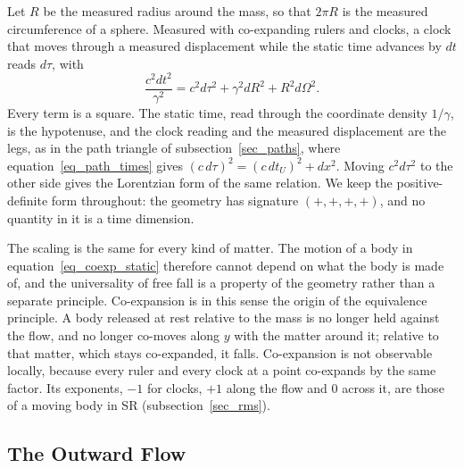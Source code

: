 \documentclass{iopjournal}
\begin{document}
Let $R$ be the measured radius around the mass, so that $2\pi R$ is the measured circumference of a sphere. Measured with co-expanding rulers and clocks, a clock that moves through a measured displacement while the static time advances by $dt$ reads $d\tau$, with
\begin{equation}\label{eq_coexp_static}
    \frac{c^2dt^2}{\gamma^2}=c^2d\tau^2+\gamma^2dR^2+R^2d\Omega^2 .
\end{equation}
Every term is a square. The static time, read through the coordinate density $1/\gamma$, is the hypotenuse, and the clock reading and the measured displacement are the legs, as in the path triangle of subsection~\ref{sec_paths}, where equation~\eqref{eq_path_times} gives $(c\,d\tau)^2=(c\,dt_U)^2+dx^2$. Moving $c^2d\tau^2$ to the other side gives the Lorentzian form of the same relation. We keep the positive-definite form throughout: the geometry has signature $(+,+,+,+)$, and no quantity in it is a time dimension.

The scaling is the same for every kind of matter. The motion of a body in equation~\eqref{eq_coexp_static} therefore cannot depend on what the body is made of, and the universality of free fall is a property of the geometry rather than a separate principle. Co-expansion is in this sense the origin of the equivalence principle. A body released at rest relative to the mass is no longer held against the flow, and no longer co-moves along $y$ with the matter around it; relative to that matter, which stays co-expanded, it falls. Co-expansion is not observable locally, because every ruler and every clock at a point co-expands by the same factor. Its exponents, $-1$ for clocks, $+1$ along the flow and $0$ across it, are those of a moving body in SR (subsection~\ref{sec_rms}).

\subsection{The Outward Flow}\label{sec_pg_relation}
\end{document}
